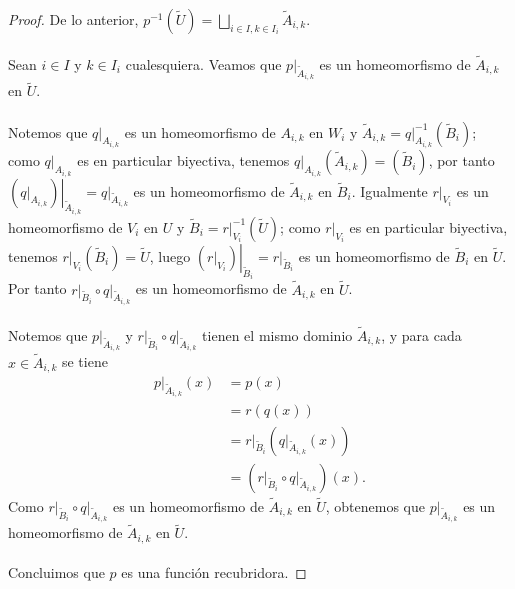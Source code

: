 \begin{proof}
   De lo anterior, $p^{-1}\left( \widetilde{U}\right)=\bigsqcup_{i\in I, k\in I_i}\widetilde{A}_{i,k}$.\\\\
   Sean $i\in I$ y $k\in I_i$ cualesquiera. Veamos que $\left.p\right|_{\widetilde{A}_{i,k}}$ es un homeomorfismo de $\widetilde{A}_{i,k}$ en $\widetilde{U}$.\\\\
   Notemos que $\left.q\right|_{A_{i,k}}$ es un homeomorfismo de $A_{i,k}$ en $W_i$ y $\widetilde{A}_{i,k}=\left.q\right|_{A_{i,k}}^{-1}\left( \widetilde{B}_i\right)$; como $\left.q\right|_{A_{i,k}}$ es en particular biyectiva, tenemos $\left.q\right|_{A_{i,k}}\left( \widetilde{A}_{i,k}\right)=\left( \widetilde{B}_i\right)$, por tanto $\left.\left( \left.q\right|_{A_{i,k}}\right)\right|_{\widetilde{A}_{i,k}}=\left.q\right|_{\widetilde{A}_{i,k}}$ es un homeomorfismo de $\widetilde{A}_{i,k}$ en $\widetilde{B}_i$. Igualmente $\left.r\right|_{V_i}$ es un homeomorfismo de $V_i$ en $U$ y $\widetilde{B}_i=\left.r\right|_{V_i}^{-1}\left( \widetilde{U}\right)$; como $\left.r\right|_{V_i}$ es en particular biyectiva, tenemos $\left.r\right|_{V_i}\left( \widetilde{B}_i\right)=\widetilde{U}$, luego $\left.\left( \left.r\right|_{V_i}\right)\right|_{\widetilde{B}_{i}}=\left.r\right|_{\widetilde{B}_{i}}$ es un homeomorfismo de $\widetilde{B}_i$ en $\widetilde{U}$. Por tanto $\left.r\right|_{\widetilde{B}_i}\circ\left.q\right|_{\widetilde{A}_{i,k}}$ es un homeomorfismo de $\widetilde{A}_{i,k}$ en $\widetilde{U}$.\\\\
   Notemos que $\left.p\right|_{\widetilde{A}_{i,k}}$ y $\left.r\right|_{\widetilde{B}_i}\circ\left.q\right|_{\widetilde{A}_{i,k}}$ tienen el mismo dominio $\widetilde{A}_{i,k}$, y para cada $x\in\widetilde{A}_{i,k}$ se tiene
   $$
   \begin{aligned}
      \left.p\right|_{\widetilde{A}_{i,k}}(x) &= p(x)\\
                                              &= r(q(x))\\
                                              &= \left.r\right|_{\widetilde{B}_i}\left( \left.q\right|_{\widetilde{A}_{i,k}}(x)\right)\\
                                              &= \left( \left.r\right|_{\widetilde{B}_i}\circ\left.q\right|_{\widetilde{A}_{i,k}}\right)(x).
   \end{aligned}
   $$
   Como $\left.r\right|_{\widetilde{B}_i}\circ\left.q\right|_{\widetilde{A}_{i,k}}$ es un homeomorfismo de $\widetilde{A}_{i,k}$ en $\widetilde{U}$, obtenemos que $\left.p\right|_{\widetilde{A}_{i,k}}$ es un homeomorfismo de $\widetilde{A}_{i,k}$ en $\widetilde{U}$.\\\\
   Concluimos que $p$ es una función recubridora.
\end{proof}
